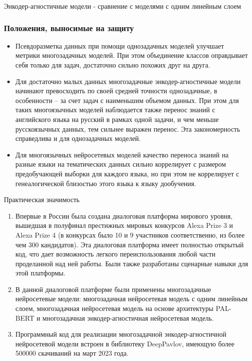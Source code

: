 \begin{frame}{Энкодер-агностичные модели - сравнение с моделями с одним линейным слоем}
\begin{frame}
    \frametitle{Положения, выносимые на защиту}
    \begin{itemize}
  \item {Псевдоразметка данных при помощи однозадачных моделей улучшает метрики многозадачных моделей. При этом объединение классов оправдывает себя только для задач, достаточно сильно похожих друг на друга.}
  \item {Для достаточно малых данных многозадачные энкодер-агностичные модели начинают превосходить по своей средней точности однозадачные, в особенности -- за счет задач с наименьшим объемом данных. При этом для таких многоязычных моделей наблюдается также перенос знаний с английского языка на русский в рамках одной задачи, и чем меньше русскоязычных данных, тем сильнее выражен перенос. Эта закономерность справедлива и для однозадачных моделей.}
  \item {Для многоязычных нейросетевых моделей качество переноса знаний на разные языки на тематических данных сильно коррелирует с размером предобучающей выборки для каждого языка, но при этом не коррелирует с генеалогической близостью этого языка к языку дообучения.}
    \end{itemize}
\end{frame}

\begin{frame}{Практическая значимость}
\begin{enumerate}
   \item Впервые в России была создана диалоговая платформа мирового уровня, вышедшая в полуфинал престижных мировых конкурсов Alexa Prize 3 и Alexa Prize 4 (в конкурсах было 10 и 9 участников соответственно, из более чем 300 кандидатов). Эта диалоговая платформа имеет полностью открытый код, что дает возможность легкого переиспользования любой части проделанной над ней работы. Были также разработаны сценарные навыки для этой платформы.
   \item В данной диалоговой платформе были применены многозадачные нейросетевые модели: многозадачная нейросетевая модель с одним линейным слоем, многозадачная нейросетевая модель на основе архитектуры PAL-BERT и многозадачная энкодер-агностичная нейросетевая модель.
   \item Программный код для реализации многозадачной энкодер-агностичной нейросетевой модели встроен в библиотеку DeepPavlov, имеющую более 500000 скачиваний на март 2023 года.
\end{enumerate}    
\end{frame}



\end{frame}
